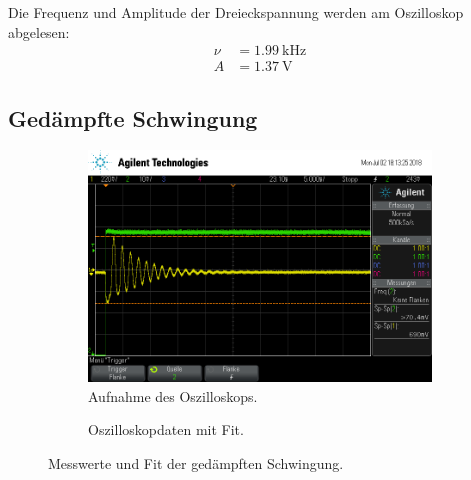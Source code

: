 Die Frequenz und Amplitude der Dreieckspannung werden am Oszilloskop abgelesen:
\begin{align*}
  \nu &= \SI{1.99}{\kilo\hertz} \\
  A &= \SI{1.37}{\volt}
\end{align*}

\subsection{Ged\"ampfte Schwingung}

\begin{figure}[ht]
  \centering
  \begin{subfigure}{\textwidth}
    \centering
    \includegraphics[height=0.3\textheight]{data/scope_275.png}
    \caption{Aufnahme des Oszilloskops.}%
    \label{fig:gedaempft_oszilloskop}
  \end{subfigure}
  \begin{subfigure}{\textwidth}
    \centering
    
    \caption{Oszilloskopdaten mit Fit.}%
    \label{fig:gedaempft_fit}
  \end{subfigure}
  \caption{Messwerte und Fit der gedämpften Schwingung.}%
  \label{fig:gedaempft}
\end{figure}

